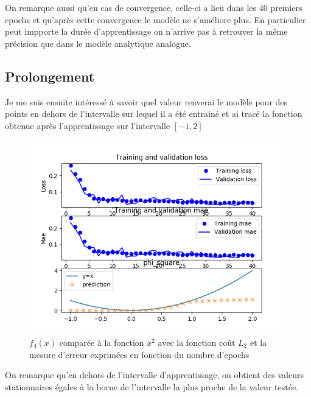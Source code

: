 \documentclass[a4paper,11pt,twoside]{report}
\begin{document}
	On remarque aussi qu'en cas de convergence, celle-ci a lieu dans les 40 premiers epochs et qu'après cette convergence le modèle ne s'améliore plus. En particulier peut impporte la durée d'apprentissage on n'arrive pas à retrouver la même précision que dans le modèle analytique analogue. 
	
	\subsection{Prolongement}
	Je me suis ensuite intéressé à savoir quel valeur renverai le modèle pour des points en dehors de l'intervalle sur lequel il a été entrainé et ai tracé la fonction obtenue après l'apprentissage sur l'intervalle $[-1,2]$
	\begin{figure}[H]
		\begin{center}
			\includegraphics[width=0.7\linewidth]{prolongementx2.png}
			\caption{$f_4(x)$ comparée à la fonction $x^2$  avec la fonction coût $L_2$ et la mesure d'erreur exprimées en fonction du nombre d'epochs}
		\end{center}
	\end{figure}
	On remarque qu'en dehors de l'intervalle d'apprentissage, on obtient des valeurs stationnaires égales à la borne de l'intervalle la plus proche de la valeur testée.
\end{document}
